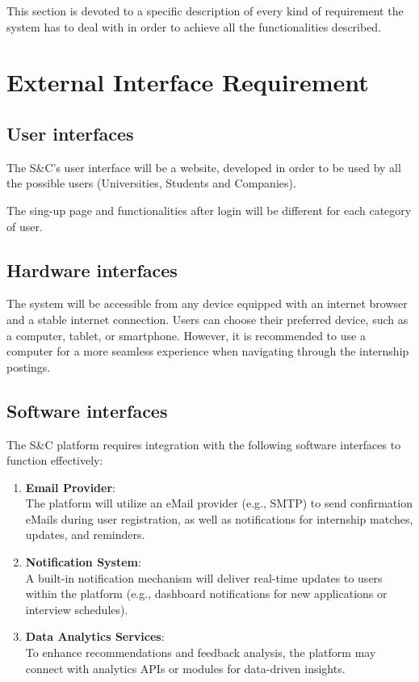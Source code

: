 This section is devoted to a specific description of every kind of requirement the system has to deal with in order to achieve all the functionalities described.


\section{ External Interface Requirement}
\label{sec:external_interface_requirements}%


\subsection{User interfaces}
\label{subsec:User_interfaces}%


The S\&C's user interface will be a website, developed in order to be
used by all the possible users (Universities, Students and Companies).

The sing-up page and functionalities after login will be different for
each category of user.


\subsection{Hardware interfaces}
\label{subsec:hardware_interfaces}%


The system will be accessible from any device equipped with an internet
browser and a stable internet connection. Users can choose their
preferred device, such as a computer, tablet, or smartphone. However, it
is recommended to use a computer for a more seamless experience when
navigating through the internship postings.


\subsection{Software interfaces}
\label{subsec:software_interfaces}%


The S\&C platform requires integration with the following software
interfaces to function effectively:

\begin{enumerate}
\def\labelenumi{\arabic{enumi}.}
\item
  \textbf{Email Provider}:\\
  The platform will utilize an eMail provider (e.g., SMTP) to send
  confirmation eMails during user registration, as well as notifications
  for internship matches, updates, and reminders.
\item
  \textbf{Notification System}:\\
  A built-in notification mechanism will deliver real-time updates to
  users within the platform (e.g., dashboard notifications for new
  applications or interview schedules).
\item
  \textbf{Data Analytics Services}:\\
  To enhance recommendations and feedback analysis, the platform may
  connect with analytics APIs or modules for data-driven insights.
\end{enumerate}

